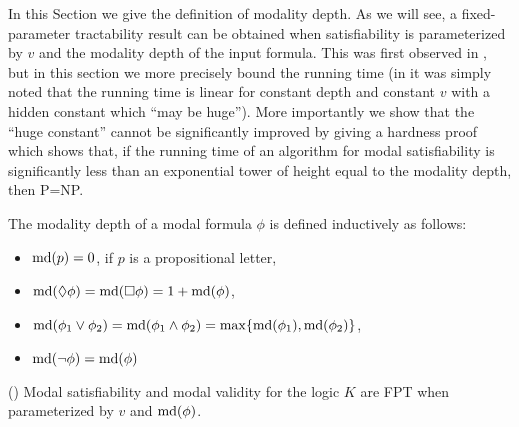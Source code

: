\documentclass{llncs}
\newcommand{\md}{\ensuremath \textrm{md}}
\begin{document}
In this Section we give the definition of modality depth. As we will see, a
fixed-parameter tractability result can be obtained when satisfiability is
parameterized by $v$ and the modality depth of the input formula.  This was
first observed in \cite{DBLP:journals/ai/Halpern95}, but in this section we
more precisely bound the running time (in \cite{DBLP:journals/ai/Halpern95} it
was simply noted that the running time is linear for constant depth and
constant $v$ with a hidden constant which ``may be huge''). More importantly we
show that the ``huge constant'' cannot be significantly improved by giving a
hardness proof which shows that, if the running time of an algorithm for modal
satisfiability is significantly less than an exponential tower of height equal
to the modality depth, then P=NP.

\begin{definition}
The modality depth of a modal formula $\phi$ is defined inductively
as follows:
\begin{itemize}
\item $\md(p)=0 $, if $p$ is a propositional letter,
\item $\md(\Diamond \phi) =\md(\Box \phi) = 1+\md(\phi)$,
\item $\md(\phi_1\lor \phi_2) = \md(\phi_1\land \phi_2) = \max\{\md(\phi_1),\md(\phi_2)\}$,
\item $\md(\neg \phi) = \md(\phi)$
\end{itemize}
\end{definition}

\begin{theorem} (\cite{DBLP:journals/ai/Halpern95}) \label{thm:depth_upper}
Modal satisfiability and modal validity for the logic $K$ are FPT when parameterized by $v$ and $\md(\phi)$.
\end{theorem}
\end{document}
